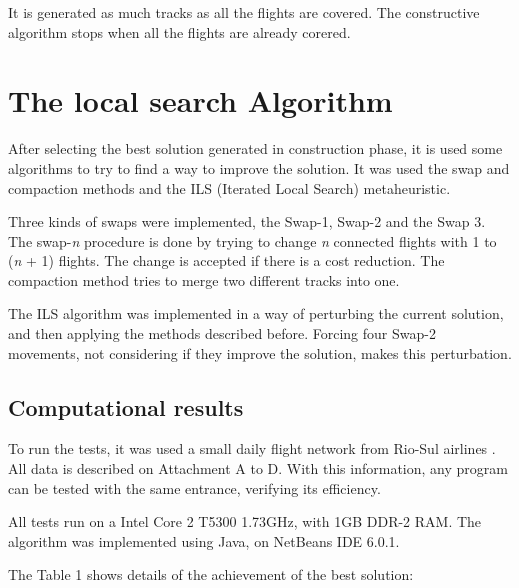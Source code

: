 \documentclass{endm}
\begin{document}
It is generated as much tracks as all the flights are covered. The constructive algorithm stops when all the flights are already corered.	

\section{The local search Algorithm}

After selecting the best solution generated in construction phase, it is used some algorithms to try to find a way to improve the solution. It was used the swap and compaction methods and the ILS (Iterated Local Search) metaheuristic.

Three kinds of swaps were implemented, the Swap-1, Swap-2 and the Swap 3. The swap-\textit{n} procedure is done by trying to change \textit{n} connected flights with 1 to (\textit{n} + 1) flights. The change is accepted if there is a cost reduction. The compaction method tries to merge two different tracks into one. 

The ILS algorithm was implemented in a way of perturbing the current solution, and then applying the methods described before. Forcing four Swap-2 movements, not considering if they improve the solution, makes this perturbation.


\subsection{Computational results}

To run the tests, it was used a small daily flight network from Rio-Sul airlines \cite{pimentel2005}. All data is described on Attachment A to D. With this information, any program can be tested with the same entrance, verifying its efficiency. 

All tests run on a Intel Core 2 T5300 1.73GHz, with 1GB DDR-2 RAM. The algorithm was implemented using Java, on NetBeans IDE 6.0.1.

The Table 1 shows details of the achievement of the best solution:\\
\end{document}
